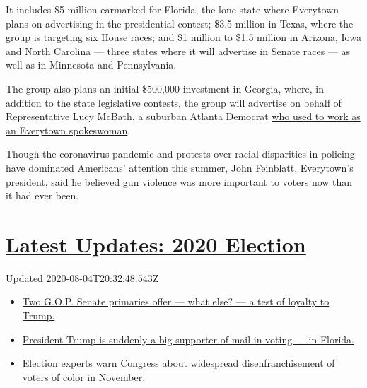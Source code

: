 It includes \$5 million earmarked for Florida, the lone state where
Everytown plans on advertising in the presidential contest; \$3.5
million in Texas, where the group is targeting six House races; and \$1
million to \$1.5 million in Arizona, Iowa and North Carolina --- three
states where it will advertise in Senate races --- as well as in
Minnesota and Pennsylvania.

The group also plans an initial \$500,000 investment in Georgia, where,
in addition to the state legislative contests, the group will advertise
on behalf of Representative Lucy McBath, a suburban Atlanta Democrat
\href{https://www.nytimes.com/2018/10/24/us/politics/lucy-mcbath-georgia-black-lives-matter.html}{who
used to work as an Everytown spokeswoman}.

Though the coronavirus pandemic and protests over racial disparities in
policing have dominated Americans' attention this summer, John
Feinblatt, Everytown's president, said he believed gun violence was more
important to voters now than it had ever been.

\hypertarget{latest-updates-2020-election}{%
\section{\texorpdfstring{\href{https://www.nytimes.com/2020/08/04/us/elections/primary-election-michigan-arizona-kansas.html?action=click\&pgtype=Article\&state=default\&region=MAIN_CONTENT_1\&context=storylines_live_updates}{Latest
Updates: 2020
Election}}{Latest Updates: 2020 Election}}\label{latest-updates-2020-election}}

Updated 2020-08-04T20:32:48.543Z

\begin{itemize}
\tightlist
\item
  \href{https://www.nytimes.com/2020/08/04/us/elections/primary-election-michigan-arizona-kansas.html?action=click\&pgtype=Article\&state=default\&region=MAIN_CONTENT_1\&context=storylines_live_updates\#link-3924dd44}{Two
  G.O.P. Senate primaries offer --- what else? --- a test of loyalty to
  Trump.}
\item
  \href{https://www.nytimes.com/2020/08/04/us/elections/primary-election-michigan-arizona-kansas.html?action=click\&pgtype=Article\&state=default\&region=MAIN_CONTENT_1\&context=storylines_live_updates\#link-32b39e33}{President
  Trump is suddenly a big supporter of mail-in voting --- in Florida.}
\item
  \href{https://www.nytimes.com/2020/08/04/us/elections/primary-election-michigan-arizona-kansas.html?action=click\&pgtype=Article\&state=default\&region=MAIN_CONTENT_1\&context=storylines_live_updates\#link-6d019753}{Election
  experts warn Congress about widespread disenfranchisement of voters of
  color in November.}
\end{itemize}

